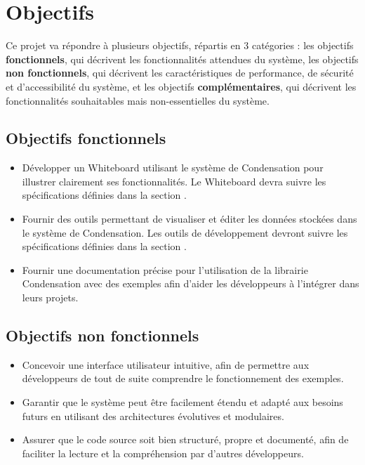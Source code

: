 \section*{Objectifs}
Ce projet va répondre à plusieurs objectifs, répartis en 3 catégories : les objectifs \textbf{fonctionnels}, qui décrivent les fonctionnalités attendues du système, les objectifs \textbf{non fonctionnels}, qui décrivent les caractéristiques de performance, de sécurité et d'accessibilité du système, et les objectifs \textbf{complémentaires}, qui décrivent les fonctionnalités souhaitables mais non-essentielles du système.

\subsection*{Objectifs \guillemotleft fonctionnels\guillemotright}

\begin{itemize}
    \item Développer un Whiteboard utilisant le système de Condensation pour illustrer clairement ses fonctionnalités. Le Whiteboard devra suivre les spécifications définies dans la section .
    \item Fournir des outils permettant de visualiser et éditer les données stockées dans le système de Condensation. Les outils de développement devront suivre les spécifications définies dans la section .
    \item Fournir une documentation précise pour l'utilisation de la librairie Condensation avec des exemples afin d'aider les développeurs à l'intégrer dans leurs projets.
\end{itemize}

\subsection*{Objectifs \guillemotleft non fonctionnels\guillemotright}

\begin{itemize}
    \item Concevoir une interface utilisateur intuitive, afin de permettre aux développeurs de tout de suite comprendre le fonctionnement des exemples.
    \item Garantir que le système peut être facilement étendu et adapté aux besoins futurs en utilisant des architectures évolutives et modulaires.
    \item Assurer que le code source soit bien structuré, propre et documenté, afin de faciliter la lecture et la compréhension par d'autres développeurs.
\end{itemize}

